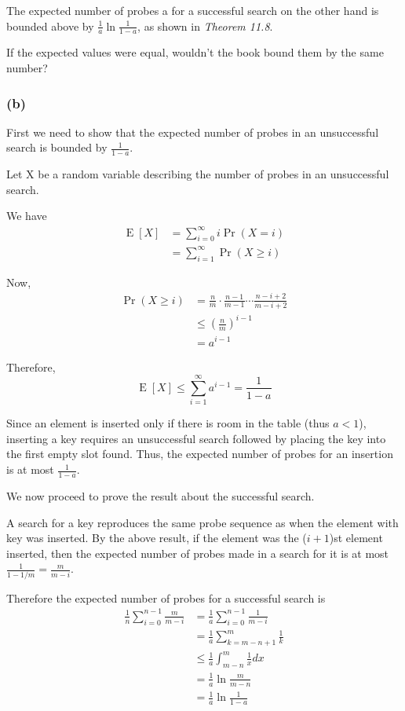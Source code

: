 \documentclass{article}
\DeclareMathOperator{\E}{\textrm{E}}
\begin{document}
The expected number of probes a for a successful search on the other hand
is bounded above by \(\frac{1}{a} \ln\frac{1}{1-a}\),
as shown in \emph{Theorem 11.8}.

If the expected values were equal,
wouldn't the book bound them by the same number?

\subsubsection*{(b)}

First we need to show that the expected number of probes in an unsuccessful
search is bounded by \(\frac{1}{1-a}\).

Let X be a random variable describing
the number of probes in an unsuccessful search.

We have
\begin{align*}
    \E[X]
        &= \sum_{i = 0}^\infty i \Pr(X = i)\\
        &= \sum_{i = 1}^\infty \Pr(X \geq i)
\end{align*}

Now,
\begin{align*}
    \Pr(X \geq i)
        &= \frac{n}{m} \cdot \frac{n-1}{m-1} \cdots \frac{n-i+2}{m-i+2}\\
        &\leq \left( \frac{n}{m} \right) ^ {i-1}\\
        &= a^{i-1}
\end{align*}

Therefore,
\begin{equation*}
    \E[X] \leq \sum_{i = 1}^\infty a^{i-1} = \frac{1}{1-a}
\end{equation*}

Since an element is inserted only
if there is room in the table (thus \(a < 1\)),
inserting a key requires an unsuccessful search
followed by placing the key into the first empty slot found.
Thus, the expected number of probes for an insertion
is at most \(\frac{1}{1-a}\).

We now proceed to prove the result about the successful search.

A search for a key reproduces the same probe sequence as when the
element with key was inserted.
By the above result, if the element was the (\(i+1\))st element inserted,
then the expected number of probes made in a search for it
is at most \(\frac{1}{1 - 1/m} = \frac{m}{m-i}\).

Therefore the expected number of probes for a successful search is
\begin{align*}
    \frac{1}{n} \sum_{i=0}^{n-1} \frac{m}{m-i}
        &= \frac{1}{a} \sum_{i=0}^{n-1} \frac{1}{m-i}\\
        &= \frac{1}{a} \sum_{k=m-n+1}^m \frac{1}{k}\\
        &\leq \frac{1}{a} \int_{m-n}^m \frac{1}{x} dx\\
        &= \frac{1}{a} \ln\frac{m}{m-n}\\
        &= \frac{1}{a} \ln\frac{1}{1-a}
\end{align*}
\end{document}
